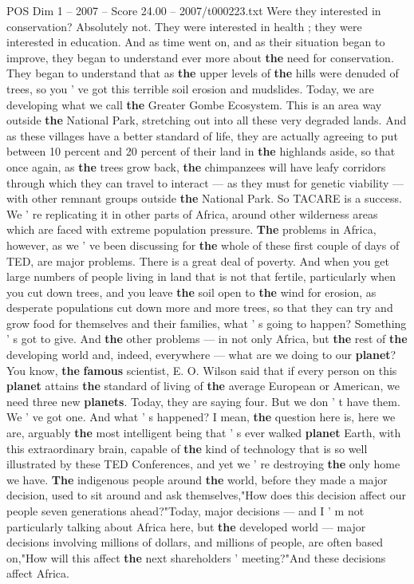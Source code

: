\begin{textsample}{POS Dim 1 – 2007 – Score 24.00 – 2007/t000223.txt}
Were they interested in conservation?
Absolutely not.
They were interested in health ; they were interested in education.
And as time went on, and as their situation began to improve, they began to understand ever more about \textbf{the} need for conservation.
They began to understand that as \textbf{the} upper levels of \textbf{the} hills were denuded of trees, so you ' ve got this terrible soil erosion and mudslides.
Today, we are developing what we call \textbf{the} Greater Gombe Ecosystem.
This is an area way outside \textbf{the} National Park, stretching out into all these very degraded lands.
And as these villages have a better standard of life, they are actually agreeing to put between 10 percent and 20 percent of their land in \textbf{the} highlands aside, so that once again, as \textbf{the} trees grow back, \textbf{the} chimpanzees will have leafy corridors through which they can travel to interact — as they must for genetic viability — with other remnant groups outside \textbf{the} National Park.
So TACARE is a success.
We ' re replicating it in other parts of Africa, around other wilderness areas which are faced with extreme population pressure. \textbf{The} problems in Africa, however, as we ' ve been discussing for \textbf{the} whole of these first couple of days of TED, are major problems.
There is a great deal of poverty.
And when you get large numbers of people living in land that is not that fertile, particularly when you cut down trees, and you leave \textbf{the} soil open to \textbf{the} wind for erosion, as desperate populations cut down more and more trees, so that they can try and grow food for themselves and their families, what ' s going to happen?
Something ' s got to give.
And \textbf{the} other problems — in not only Africa, but \textbf{the} rest of \textbf{the} developing world and, indeed, everywhere — what are we doing to our \textbf{planet}?
You know, \textbf{the} \textbf{famous} scientist, E.
O.
Wilson said that if every person on this \textbf{planet} attains \textbf{the} standard of living of \textbf{the} average European or American, we need three new \textbf{planets}.
Today, they are saying four.
But we don ' t have them.
We ' ve got one.
And what ' s happened?
I mean, \textbf{the} question here is, here we are, arguably \textbf{the} most intelligent being that ' s ever walked \textbf{planet} Earth, with this extraordinary brain, capable of \textbf{the} kind of technology that is so well illustrated by these TED Conferences, and yet we ' re destroying \textbf{the} only home we have. \textbf{The} indigenous people around \textbf{the} world, before they made a major decision, used to sit around and ask themselves,"How does this decision affect our people seven generations ahead?"Today, major decisions — and I ' m not particularly talking about Africa here, but \textbf{the} developed world — major decisions involving millions of dollars, and millions of people, are often based on,"How will this affect \textbf{the} next shareholders ' meeting?"And these decisions affect Africa.

\end{textsample}
